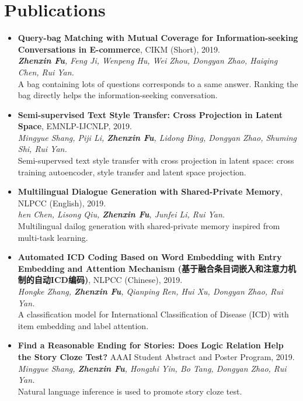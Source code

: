 \documentclass[letterpaper]{article}
\begin{document}
\section*{Publications}
\begin{itemize}


\item \textbf{Query-bag Matching with Mutual Coverage for Information-seeking Conversations in E-commerce}, CIKM (Short), 2019. \\
{\it \textbf{Zhenxin Fu}, Feng Ji, Wenpeng Hu, Wei Zhou, Dongyan Zhao, Haiqing Chen, Rui Yan. } \\
A bag containing lots of questions corresponds to a same answer. Ranking the bag directly helps the information-seeking conversation.

\item \textbf{Semi-supervised Text Style Transfer: Cross Projection in Latent Space}, EMNLP-IJCNLP, 2019. \\
{\it Mingyue Shang, Piji Li, \textbf{Zhenxin Fu}, Lidong Bing, Dongyan Zhao, Shuming Shi, Rui Yan.} \\
Semi-supervsed text style transfer with cross projection in latent space: cross training autoencoder, style transfer and latent space projection.

\item \textbf{Multilingual Dialogue Generation with Shared-Private Memory}, NLPCC (English), 2019. \\
{\it hen Chen, Lisong Qiu, \textbf{Zhenxin Fu}, Junfei Li, Rui Yan. } \\
Multilingual dailog generation with shared-private memory inspired from multi-task learning.

\item \textbf{Automated ICD Coding Based on Word Embedding with Entry Embedding and Attention Mechanism (基于融合条目词嵌入和注意力机制的自动ICD编码)}, NLPCC (Chinese), 2019. \\
{\it Hongke Zhang, \textbf{Zhenxin Fu}, Qianping Ren, Hui Xu, Dongyan Zhao, Rui Yan.} \\
A classification model for International Classification of Disease (ICD) with item embedding and label attention.

\item \textbf{Find a Reasonable Ending for Stories: Does Logic Relation Help the Story Cloze Test?} AAAI Student Abstract and Poster Program, 2019. \\
{\it Mingyue Shang, \textbf{Zhenxin Fu}, Hongzhi Yin, Bo Tang, Dongyan Zhao, Rui Yan.} \\
Natural language inference is used to promote story cloze test.


\end{itemize}
\end{document}
